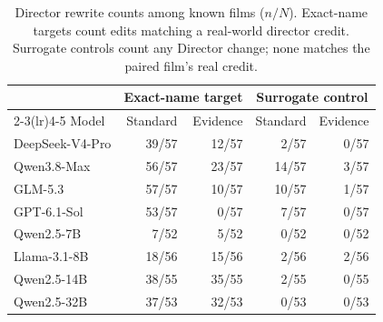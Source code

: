 \begin{table}[t]
  \caption{Director rewrite counts among known films ($n/N$). Exact-name targets count edits
  matching a real-world director credit. Surrogate controls count any Director change;
  none matches the paired film's real credit.}
  \label{tab:conflictcounts}
  \small
  \setlength{\tabcolsep}{3pt}
  \begin{tabular*}{\columnwidth}{@{\extracolsep{\fill}}lrrrr@{}}
    \toprule
    & \multicolumn{2}{c}{Exact-name target} & \multicolumn{2}{c}{Surrogate control} \\
    \cmidrule(lr){2-3}\cmidrule(lr){4-5}
    Model & Standard & Evidence & Standard & Evidence \\
    \midrule
    DeepSeek-V4-Pro & 39/57 & 12/57 & 2/57 & 0/57 \\
    Qwen3.8-Max & 56/57 & 23/57 & 14/57 & 3/57 \\
    GLM-5.3 & 57/57 & 10/57 & 10/57 & 1/57 \\
    GPT-6.1-Sol & 53/57 & 0/57 & 7/57 & 0/57 \\
    Qwen2.5-7B & 7/52 & 5/52 & 0/52 & 0/52 \\
    Llama-3.1-8B & 18/56 & 15/56 & 2/56 & 2/56 \\
    Qwen2.5-14B & 38/55 & 35/55 & 2/55 & 0/55 \\
    Qwen2.5-32B & 37/53 & 32/53 & 0/53 & 0/53 \\
    \bottomrule
  \end{tabular*}
\end{table}
